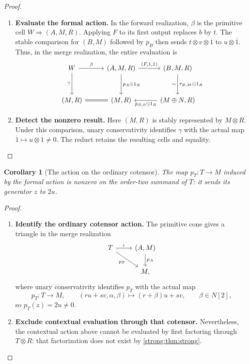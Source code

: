\documentclass[11pt,reqno]{amsart}
\theoremstyle{plain}
\newtheorem{corollary}[theorem]{Corollary}
\theoremstyle{definition}
\theoremstyle{remark}
\numberwithin{equation}{section}
\newcommand{\cell}{\mathrel{\Longrightarrow}}
\newcommand{\wh}{\mathbin{\odot}}
\begin{document}
\begin{proof}
\begin{enumerate}
\item \textbf{Evaluate the formal action.} In the forward realization, $\beta$ is the primitive cell
$W\cell(A,M,R)$. Applying $F$ to its first output replaces $b$ by $t$.
The stable comparison for $(B,M)$ followed by $p_B$ then sends
$t\otimes v\otimes\overline1$ to $u\otimes\overline1$. Thus, in the
merge realization, the entire evaluation is
\[
\begin{tikzcd}[column sep=2.8em,row sep=3em]
W \arrow[r,"\beta"] \arrow[d,"\gamma"'] &
(A,M,R) \arrow[r,"{(F,1,1)}"] \arrow[d,"p_A\wh1_R"] &
(B,M,R) \arrow[d,"\tau_{B,M}\wh1_R","\sim"']\\
(M,R) \arrow[r,equal] &
(M,R) &
(M\oplus N,R) \arrow[l,"p_{B,0}\wh1_R"]
\end{tikzcd}
\]

\item \textbf{Detect the nonzero result.} Here $(M,R)$ is stably represented by $M\otimes R$.
Under this comparison, unary conservativity identifies $\gamma$ with
the actual map $\overline1\mapsto u\otimes\overline1\neq0$.
The reduct retains the resulting cells and equality.\qedhere
\end{enumerate}
\end{proof}

\begin{corollary}[The action on the ordinary cotensor]\label{strong:cor:ordinary-action}
The map $p_T:T\to M$ induced by the formal action is nonzero on the
order-two summand of $T$: it sends its generator $z$ to $2u$.
\end{corollary}
\begin{proof}\leavevmode
\begin{enumerate}
\item \textbf{Identify the ordinary cotensor action.} The primitive cone gives a triangle in the merge realization
\[
\begin{tikzcd}
T \arrow[r,"\iota"] \arrow[dr,"p_T"'] &
(A,M) \arrow[d,"p_A"]\\
& M,
\end{tikzcd}
\]
where unary conservativity identifies $p_T$ with the actual map
\[
p_T:T\longrightarrow M,\qquad
(ru+sv,\alpha,\beta)\longmapsto(r+\beta)u+sv,
\qquad \beta\in N[2],
\]
so $p_T(z)=2u\neq0$.

\item \textbf{Exclude contextual evaluation through that cotensor.} Nevertheless, the contextual action above cannot
be evaluated by first factoring through $T\otimes R$: that
factorization does not exist by \cref{strong:thm:strong}.\qedhere
\end{enumerate}
\end{proof}
\end{document}
